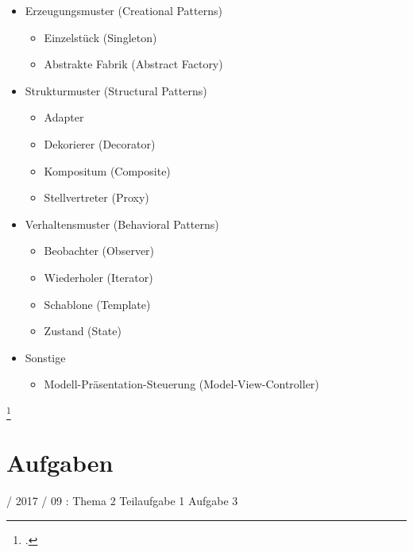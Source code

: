 \documentclass{lehramt-informatik}
\begin{document}
\begin{itemize}
\item Erzeugungsmuster (Creational Patterns)

\begin{itemize}
\item Einzelstück (Singleton)
\item Abstrakte Fabrik (Abstract Factory)
\end{itemize}

\item Strukturmuster (Structural Patterns)

\begin{itemize}
\item Adapter
\item Dekorierer (Decorator)
\item Kompositum (Composite)
\item Stellvertreter (Proxy)
\end{itemize}

\item Verhaltensmuster (Behavioral Patterns)

\begin{itemize}
\item Beobachter (Observer)
\item Wiederholer (Iterator)
\item Schablone (Template)
\item Zustand (State)
\end{itemize}

\item Sonstige

\begin{itemize}
\item Modell-Präsentation-Steuerung (Model-View-Controller)
\end{itemize}
\end{itemize}

\footcite[Seite 39]{sosy:fs:3}


\chapter{Aufgaben}

 / 2017 / 09 : Thema 2 Teilaufgabe 1 Aufgabe 3

%
\end{document}
